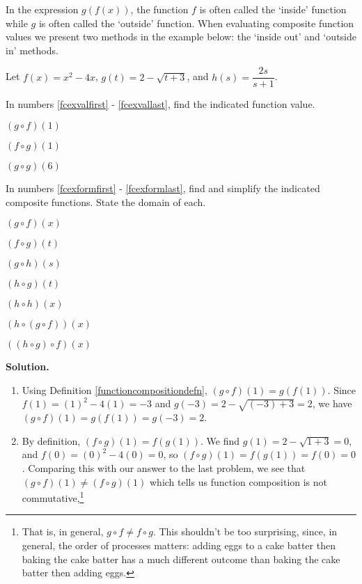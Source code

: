 \normalsize

In the expression $g(f(x))$, the function $f$ is often called the `inside' function while $g$ is often called the `outside' function.  When evaluating  composite function values we present two methods in the example below:  the `inside out' and `outside in'  methods.  

\begin{ex}  Let $f(x) = x^2-4x$, $g(t) = 2-\sqrt{t+3}$, and $h(s) = \dfrac{2s}{s+1}$.  

In numbers \ref{fcexvalfirst} - \ref{fcexvallast}, find the indicated function value.

\startexenum

\begin{shortexenum}[MMMMMMMMM]
\item  $(g \circ f)(1)$ \label{fcexvalfirst}
\item  $(f \circ g)(1)$
\item  $(g \circ g)(6)$ \label{fcexvallast}
\end{shortexenum}

In numbers \ref{fcexformfirst} - \ref{fcexformlast}, find and simplify the indicated composite functions.  State the domain of each.

\begin{shortexenum}[MMMMMMMMM]
\item  $(g \circ f)(x)$ \label{fcexformfirst}
\item  $(f \circ g)(t)$
\item  $(g \circ h)(s)$
\item  $(h \circ g)(t)$ \label{hogex}
\item  $(h \circ h)(x)$
\item  $(h \circ (g \circ f))(x)$  \label{hogoffirst}
\item  $((h \circ g) \circ f)(x)$ \label{fcexformlast}
\end{shortexenum}

{\bf Solution.}  
\begin{enumerate}

\item  Using Definition \ref{functioncompositiondefn}, $(g \circ f)(1) = g(f(1))$.  Since $f(1) = (1)^2 - 4(1) = -3$ and $g(-3) = 2 - \sqrt{(-3)+3} = 2$, we have $(g \circ f)(1) = g(f(1)) = g(-3) = 2$.

\item  By definition, $(f \circ g)(1) = f(g(1))$.  We find $g(1) = 2 - \sqrt{1+3} = 0$, and $f(0) = (0)^2-4(0) = 0$, so $(f \circ g)(1) = f(g(1)) = f(0) = 0$. Comparing this with our answer to the last problem, we see that $(g \circ f)(1) \neq (f \circ g)(1)$  which tells us function composition is not commutative,\footnote{That is, in general, $g \circ f \neq f \circ g$.  This shouldn't be too surprising, since, in general, the order of processes matters: adding eggs to a cake batter then baking the cake batter has a much different outcome than baking the cake batter then adding eggs.}


\end{enumerate}
\end{ex}
